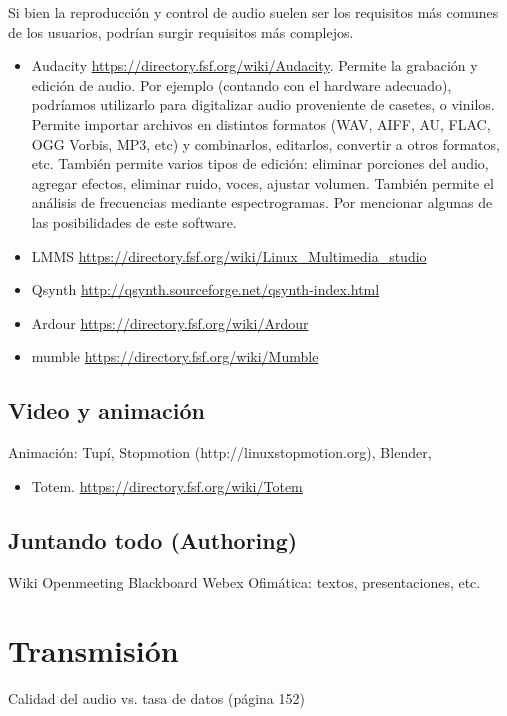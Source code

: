\documentclass[12pt]{article}
\begin{document}
Si bien la reproducción y control de audio suelen ser los 
requisitos más comunes de los usuarios, podrían surgir requisitos 
más complejos. 

\begin{itemize}
\item Audacity \url{https://directory.fsf.org/wiki/Audacity}.  
Permite la grabación y edición de audio. Por ejemplo (contando con el 
hardware adecuado), podríamos utilizarlo para digitalizar audio proveniente
de casetes, o vinilos. Permite importar archivos en distintos formatos (WAV, 
AIFF, AU, FLAC, OGG Vorbis, MP3, etc) y combinarlos, editarlos, convertir a otros 
formatos, etc. También permite varios tipos de edición: eliminar porciones del 
audio, agregar efectos, eliminar ruido, voces, ajustar volumen. También permite 
el análisis de frecuencias mediante espectrogramas. Por mencionar algunas 
de las posibilidades de este software.  
\item LMMS \url{https://directory.fsf.org/wiki/Linux\_Multimedia\_studio}
\item Qsynth \url{http://qsynth.sourceforge.net/qsynth-index.html}
\item Ardour \url{https://directory.fsf.org/wiki/Ardour} 
\item mumble \url{https://directory.fsf.org/wiki/Mumble}
\end{itemize}




\subsection*{Video y animación}
Animación: Tupí, Stopmotion (http://linuxstopmotion.org), Blender, 

\begin{itemize}
\item Totem.  \url{https://directory.fsf.org/wiki/Totem}
\end{itemize}

\subsection*{Juntando todo (Authoring)}
Wiki
Openmeeting
Blackboard
Webex
Ofimática: textos, presentaciones, etc. 

\section*{Transmisión}

Calidad del audio vs. tasa de datos (página 152)
\end{document}
